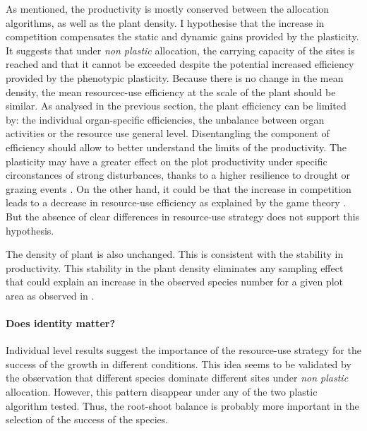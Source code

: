 As mentioned, the productivity is mostly conserved between the allocation algorithms, as well as the plant density. I hypothesise that the increase in competition compensates the static and dynamic gains provided by the plasticity. It suggests that under \textit{non plastic} allocation, the carrying capacity of the sites is reached and that it cannot be exceeded despite the potential increased efficiency provided by the phenotypic plasticity. Because there is no change in the mean density, the mean resourcec-use efficiency at the scale of the plant should be similar. As analysed in the previous section, the plant efficiency can be limited by: the individual organ-specific efficiencies, the unbalance between organ activities or the resource use general level.  Disentangling the component of efficiency should allow to better understand the limits of the productivity. The plasticity may have a greater effect on the plot productivity under specific circonstances of strong disturbances, thanks to a higher resilience to drought or grazing events \parencite{maire_plasticity_2013}. On the other hand, it could be that the increase in competition leads to a decrease in resource-use efficiency as explained by the game theory \parencite{farrior_competitive_2014}. But the absence of clear differences in resource-use strategy does not support this hypothesis.

The density of plant is also unchanged. This is consistent with the stability in productivity. This stability in the plant density eliminates any sampling effect that could explain an increase in the observed species number for a given plot area as observed in \citet{lepik_high_2005}.

\paragraph{Does identity matter?}

Individual level results suggest the importance of the resource-use strategy for the success of the growth in different conditions. This idea seems to be validated by the observation that different species dominate different sites under \textit{non plastic} allocation. However, this pattern disappear under any of the two plastic algorithm tested. Thus, the root-shoot balance is probably more important in the selection of the success of the species.

